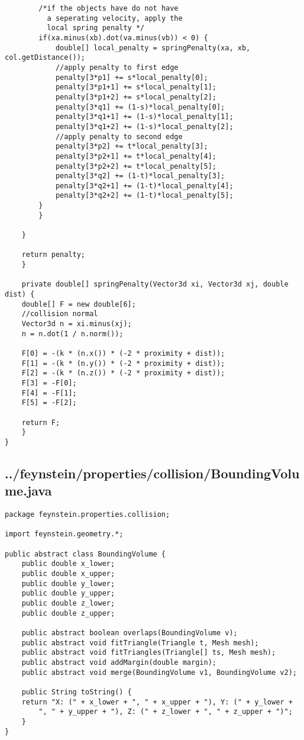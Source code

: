 \begin{lstlisting}
		/*if the objects have do not have
		  a seperating velocity, apply the 
		  local spring penalty */
		if(xa.minus(xb).dot(va.minus(vb)) < 0) {
		    double[] local_penalty = springPenalty(xa, xb, col.getDistance());
		    //apply penalty to first edge
		    penalty[3*p1] += s*local_penalty[0];
		    penalty[3*p1+1] += s*local_penalty[1];
		    penalty[3*p1+2] += s*local_penalty[2];
		    penalty[3*q1] += (1-s)*local_penalty[0];
		    penalty[3*q1+1] += (1-s)*local_penalty[1];
		    penalty[3*q1+2] += (1-s)*local_penalty[2];
		    //apply penalty to second edge
		    penalty[3*p2] += t*local_penalty[3];
		    penalty[3*p2+1] += t*local_penalty[4];
		    penalty[3*p2+2] += t*local_penalty[5];
		    penalty[3*q2] += (1-t)*local_penalty[3];
		    penalty[3*q2+1] += (1-t)*local_penalty[4];
		    penalty[3*q2+2] += (1-t)*local_penalty[5];
		}
	    }
		
	}

	return penalty;
    }

    private double[] springPenalty(Vector3d xi, Vector3d xj, double dist) {
	double[] F = new double[6];
	//collision normal
	Vector3d n = xi.minus(xj);
	n = n.dot(1 / n.norm());
	
	F[0] = -(k * (n.x()) * (-2 * proximity + dist));
	F[1] = -(k * (n.y()) * (-2 * proximity + dist));
	F[2] = -(k * (n.z()) * (-2 * proximity + dist));
	F[3] = -F[0];
	F[4] = -F[1];
	F[5] = -F[2];

	return F;
    }
}\end{lstlisting}

\subsection*{../feynstein/properties/collision/BoundingVolume.java}
\begin{lstlisting}
package feynstein.properties.collision;

import feynstein.geometry.*;

public abstract class BoundingVolume {
    public double x_lower;
    public double x_upper;
    public double y_lower;
    public double y_upper;
    public double z_lower;
    public double z_upper;

    public abstract boolean overlaps(BoundingVolume v);
    public abstract void fitTriangle(Triangle t, Mesh mesh);
    public abstract void fitTriangles(Triangle[] ts, Mesh mesh);
    public abstract void addMargin(double margin);
    public abstract void merge(BoundingVolume v1, BoundingVolume v2);

    public String toString() {
	return "X: (" + x_lower + ", " + x_upper + "), Y: (" + y_lower + 
	    ", " + y_upper + "), Z: (" + z_lower + ", " + z_upper + ")";
    }
}\end{lstlisting}

